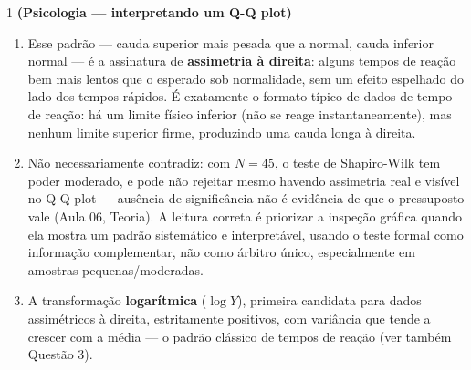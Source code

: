 \documentclass[11pt]{article}
\begin{document}

\begin{questao}{1} \textbf{(Psicologia --- interpretando um Q-Q plot)}
\end{questao}
\begin{solucao}
\begin{enumerate}[label=(\alph*)]
  \item Esse padrão --- cauda superior mais pesada que a normal, cauda inferior normal --- é a
    assinatura de \textbf{assimetria à direita}: alguns tempos de reação bem mais lentos que o
    esperado sob normalidade, sem um efeito espelhado do lado dos tempos rápidos. É exatamente o
    formato típico de dados de tempo de reação: há um limite físico inferior (não se reage
    instantaneamente), mas nenhum limite superior firme, produzindo uma cauda longa à direita.
  \item Não necessariamente contradiz: com $N=45$, o teste de Shapiro-Wilk tem poder moderado, e
    pode não rejeitar mesmo havendo assimetria real e visível no Q-Q plot --- ausência de
    significância não é evidência de que o pressuposto vale (Aula 06, Teoria). A leitura correta
    é priorizar a inspeção gráfica quando ela mostra um padrão sistemático e interpretável, usando
    o teste formal como informação complementar, não como árbitro único, especialmente em amostras
    pequenas/moderadas.
  \item A transformação \textbf{logarítmica} ($\log Y$), primeira candidata para dados
    assimétricos à direita, estritamente positivos, com variância que tende a crescer com a
    média --- o padrão clássico de tempos de reação (ver também Questão 3).
\end{enumerate}
\end{solucao}
\end{document}
